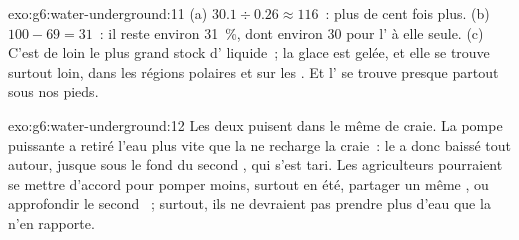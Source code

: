 \begin{solution}{exo:g6:water-underground:11}
(a) $30.1 \div 0.26 \approx 116$~: plus de cent fois plus.
(b) $100 - 69 = 31$~: il reste environ 31~\%, dont environ 30 pour l' à elle seule. (c) C'est de loin le plus grand stock d' liquide~; la
glace est gelée, et elle se trouve surtout loin, dans les régions polaires
et sur les . Et l' se trouve presque partout sous
nos pieds.
\end{solution}

\begin{solution}{exo:g6:water-underground:12}
Les deux  puisent dans le même  de craie. La pompe puissante
a retiré l'eau plus vite que la  ne recharge la craie~: le  a donc baissé tout autour, jusque sous le fond du second ,
qui s'est tari. Les agriculteurs pourraient se mettre d'accord pour pomper
moins, surtout en été, partager un même , ou approfondir le second
~; surtout, ils ne devraient pas prendre plus d'eau que la  n'en
rapporte.
\end{solution}

